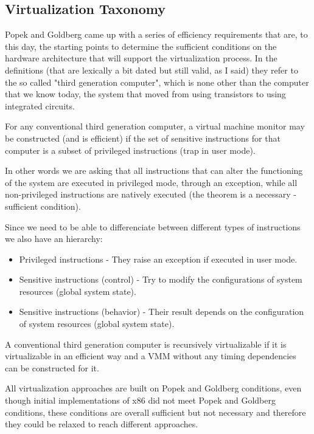 \subsection{Virtualization Taxonomy}
Popek and Goldberg came up with a series of efficiency requirements that are, to this day, the starting points to determine the sufficient conditions on the hardware architecture that will support the virtualization process. In the definitions (that are lexically a bit dated but still valid, as I said) they refer to the so called "third generation computer", which is none other than the computer that we know today, the system that moved from using transistors to using integrated circuits.
\begin{theorem}
    For any conventional third generation computer, a virtual machine monitor may be constructed (and is efficient) if the set of sensitive instructions for that computer is a subset of privileged instructions (trap in user mode).
\end{theorem}
In other words we are asking that all instructions that can alter the functioning of the system are executed in privileged mode, through an exception, while all non-privileged instructions are natively executed (the theorem is a necessary - sufficient condition).

Since we need to be able to differenciate between different types of instructions we also have an hierarchy:
\begin{itemize}
    \item Privileged instructions - They raise an exception if executed in user mode.
    \item Sensitive instructions (control) - Try to modify the configurations of system resources (global system state).
    \item Sensitive instructions (behavior) - Their result depends on the configuration of system resources (global system state).
\end{itemize}
\begin{theorem}
    A conventional third generation computer is recursively virtualizable if it is virtualizable in an efficient way and a VMM without any timing dependencies can be constructed for it.
\end{theorem}
All virtualization approaches are built on Popek and Goldberg conditions, even though initial implementations of x86 did not meet Popek and Goldberg conditions, these conditions are overall sufficient but not necessary and therefore they could be relaxed to reach different approaches.

